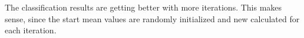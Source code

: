 \documentclass{article}
\begin{document}
The classification results are getting better with more iterations. This makes sense, since the start mean values are randomly initialized and new calculated for each iteration.
\newpage
\begin{figure}[!ht]
\end{figure}
\end{document}
